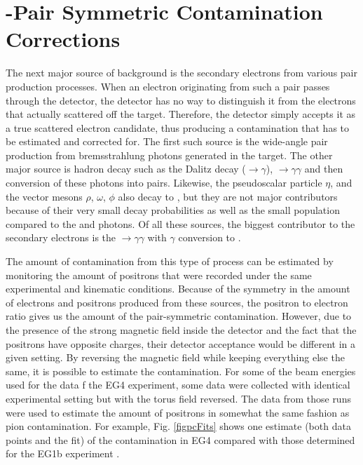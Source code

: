 
\section{\epem-Pair Symmetric Contamination Corrections}
The next major source of background is the secondary electrons from various \epems pair production processes. When an electron originating from such a pair passes through the detector, the detector has no way to distinguish it from the electrons that actually scattered off the target. Therefore, the detector simply accepts it as a true scattered electron candidate, thus producing a %
contamination that has to be estimated and corrected for. %
The first such source is the wide-angle \epems pair production from bremsstrahlung photons generated in the target. The other major source is hadron decay such as the Dalitz decay (\piz$\rightarrow$\epem$\gamma$), \piz$\rightarrow\gamma\gamma$ and then conversion of these photons into \epems pairs. Likewise, the pseudoscalar particle $\eta$, and the vector mesons $\rho$, $\omega$, $\phi$ also decay to \epem, but they are not major contributors because of their very small decay probabilities as well as the small population compared to the \pizs and photons. Of all these sources, the biggest contributor to the secondary electrons is the %
\piz$\rightarrow\gamma\gamma$ with $\gamma$ conversion to \epems \cite{bostedBckgCont}.

The amount of contamination from this type of process can be estimated by monitoring the amount of positrons that were recorded under the same experimental and kinematic conditions. Because of the symmetry in the amount of electrons and positrons produced from these sources, the positron to electron ratio %
gives us the amount of the pair-symmetric contamination. However, due to the presence of the strong magnetic field inside the detector and the fact that the positrons have opposite charges, their detector acceptance would be different in a given setting. %
By reversing the magnetic field while keeping everything else the same, it is possible to estimate the contamination. For some of the beam energies used for the  data %
f the EG4 experiment, some data were collected with identical experimental setting but with the torus field reversed. The data from those runs were used to estimate the amount of positrons in somewhat the same fashion as pion contamination. %
For example, Fig. \ref{figpcFits} shows one estimate (both data points and the fit) of the contamination in EG4 compared with those determined for the EG1b experiment \cite{nGuler_th}.



